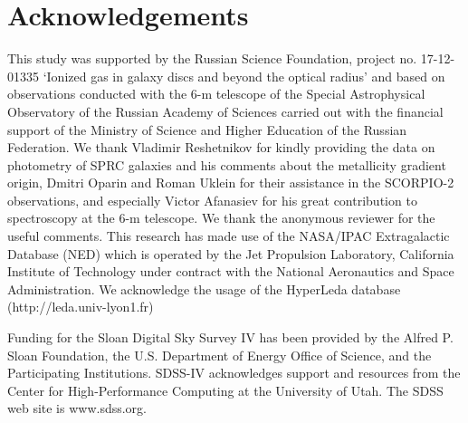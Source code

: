 \documentclass[useAMS,usenatbib]{mnras}
\begin{document}
\section*{Acknowledgements}
This study was supported by the Russian Science Foundation, project no. 17-12-01335 `Ionized gas in galaxy discs and beyond the optical radius' and based on observations conducted with the 6-m telescope of the Special Astrophysical Observatory of the Russian Academy of Sciences carried out with the financial support of the Ministry of Science and Higher Education of the Russian Federation. 
We thank Vladimir Reshetnikov for kindly providing the data on photometry of SPRC galaxies and his comments about the metallicity gradient origin,  Dmitri Oparin and Roman Uklein for their assistance in the SCORPIO-2 observations, and especially Victor Afanasiev for his great contribution to spectroscopy at the 6-m telescope.
We thank the anonymous reviewer for the useful comments.
This research has made use of the NASA/IPAC Extragalactic Database (NED) which is operated by the Jet Propulsion Laboratory, California Institute of Technology under contract with the National Aeronautics and Space Administration. We acknowledge the usage of the HyperLeda database (http://leda.univ-lyon1.fr)	

Funding for the Sloan Digital Sky Survey IV has been provided by the Alfred P. Sloan Foundation, the U.S. Department of Energy Office of Science, and the Participating Institutions. SDSS-IV acknowledges
support and resources from the Center for High-Performance Computing at
the University of Utah. The SDSS web site is www.sdss.org.

\end{document}
